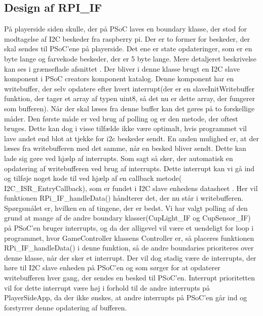 \documentclass[Softwaredesign/Softwaredesign_main.tex]{subfiles}
\begin{document}
\subsection{Design af RPI\_IF}\label{sec:RPI_IF_design_bilag}
På playerside siden skulle, der på PSoC laves en boundary klasse, der stod for modtagelse af I2C beskeder fra raspberry pi. Der er to former for beskeder, der skal sendes til PSoC'ene på playerside. Det ene er state opdateringer, som er en byte lange og farvekode beskeder, der er 5 byte lange. Mere detaljeret beskrivelse kan ses i grænseflade afsnittet . Der bliver i denne klasse brugt en I2C slave komponent i PSoC creators komponent katalog. Denne komponent har en writebuffer, der selv opdatere efter hvert interrupt(der er en slaveInitWritebuffer funktion, der tager et array af typen uint8, så det nu er dette array, der fungerer som bufferen). Når der skal læses fra denne buffer kan det gøres på to forskellige måder. Den første måde er ved brug af polling og er den metode, der oftest bruges. Dette kan dog i visse tilfælde ikke være optimalt, hvis programmet vil lave andet end blot at tjekke for i2c beskeder sendt. En anden mulighed er, at der læses fra writebufferen med det samme, når en besked bliver sendt. Dette kan lade sig gøre ved hjælp af interrupts. Som sagt så sker, der automatisk en opdatering af writebufferen ved brug af interrupts. Dette interrupt kan vi gå ind og tilføje noget kode til ved hjælp af en callback metode( I2C\_ISR\_EntryCallback), som er fundet i I2C slave enhedens datasheet \autocite{i2c_slave_datasheet}. Her vil funktionen RPi\_IF\_handleData() håndterer det, der nu står i writebufferen. Spørgsmålet er, hvilken en af tingene, der er bedst. Vi har valgt polling af den grund at mange af de andre boundary klasser(CupLight\_IF og CupSensor\_IF) på PSoC'en bruger interrupts, og da der alligevel vil være et uendeligt for loop i programmet, hvor GameController klassens Controller er, så placeres funktionen RPi\_IF\_handleData() i denne funktion, så de andre boundaries prioriteres over denne klasse, når der sker et interrupt. Der vil dog stadig være de interrupts, der høre til I2C slave enheden på PSoC'en og som sørger for at opdaterer writebufferen hver gang, der sendes en besked til PSoC'en. Interrupt prioritetten vil for dette interrupt være høj i forhold til de andre interrupts på PlayerSideApp, da der ikke ønskes, at andre interrupts på PSoC'en går ind og forstyrrer denne opdatering af bufferen. 
\end{document}
